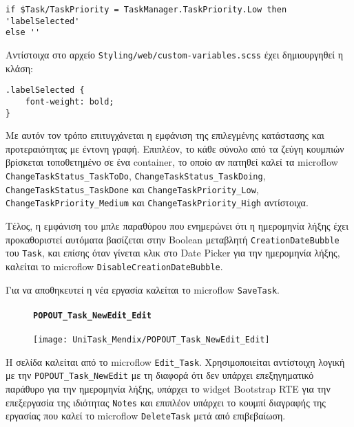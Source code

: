                 \begin{lstlisting}[mystyle]
if $Task/TaskPriority = TaskManager.TaskPriority.Low then 'labelSelected'
else ''         \end{lstlisting}

Αντίστοιχα στο αρχείο \verb|Styling/web/custom-variables.scss| έχει δημιουργηθεί η κλάση:
                \begin{lstlisting}[mystyle]
.labelSelected {
    font-weight: bold;
}                \end{lstlisting}

                Με αυτόν τον τρόπο επιτυγχάνεται η εμφάνιση της επιλεγμένης κατάστασης και προτεραιότητας με έντονη γραφή. Επιπλέον, το κάθε σύνολο από τα ζεύγη κουμπιών βρίσκεται τοποθετημένο σε ένα container, το οποίο αν πατηθεί καλεί τα microflow \texttt{ChangeTaskStatus\_TaskToDo}, \texttt{ChangeTaskStatus\_TaskDoing}, \texttt{ChangeTaskStatus\_}\linebreak\texttt{TaskDone} και \texttt{ChangeTaskPriority\_Low}, \texttt{ChangeTaskPriority\_Medium} και \linebreak \texttt{ChangeTaskPriority\_High} αντίστοιχα.

                Τέλος, η εμφάνιση του μπλε παραθύρου που ενημερώνει ότι η ημερομηνία λήξης έχει προκαθοριστεί αυτόματα βασίζεται στην Boolean μεταβλητή \texttt{CreationDateBubble} του \texttt{Task}, και επίσης όταν γίνεται κλικ στο Date Picker για την ημερομηνία λήξης, καλείται το microflow  \texttt{DisableCreationDateBubble}.

                Για να αποθηκευτεί η νέα εργασία καλείται το microflow \texttt{SaveTask}.

                \begin{figure}[H] \noindent
                    \paragraph{\texttt{POPOUT\_Task\_NewEdit\_Edit}}
                    \begin{center}
                        \texttt{[image: UniTask\_Mendix/POPOUT\_Task\_NewEdit\_Edit]}
                    \end{center}
                \end{figure}

                Η σελίδα καλείται από το microflow \texttt{Edit\_Task}. Χρησιμοποιείται αντίστοιχη λογική με την \texttt{POPOUT\_Task\_NewEdit} με τη διαφορά ότι δεν υπάρχει επεξηγηματικό παράθυρο για την ημερομηνία λήξης, υπάρχει το widget Bootstrap RTE για την επεξεργασία της ιδιότητας \texttt{Notes} και επιπλέον υπάρχει το κουμπί διαγραφής της εργασίας που καλεί το microflow \texttt{DeleteTask} μετά από επιβεβαίωση.


